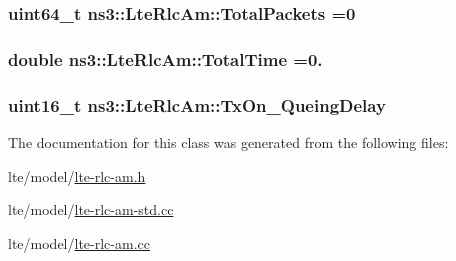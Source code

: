 \subsubsection[{\texorpdfstring{Total\+Packets}{TotalPackets}}]{\setlength{\rightskip}{0pt plus 5cm}uint64\+\_\+t ns3\+::\+Lte\+Rlc\+Am\+::\+Total\+Packets =0\hspace{0.3cm}{\ttfamily [private]}}\hypertarget{classns3_1_1LteRlcAm_a1b03629adba01263bcdb8a64606eddea}{}\label{classns3_1_1LteRlcAm_a1b03629adba01263bcdb8a64606eddea}
\subsubsection[{\texorpdfstring{Total\+Time}{TotalTime}}]{\setlength{\rightskip}{0pt plus 5cm}double ns3\+::\+Lte\+Rlc\+Am\+::\+Total\+Time =0.\hspace{0.3cm}{\ttfamily [private]}}\hypertarget{classns3_1_1LteRlcAm_a7ea7ad8fc456ed782e8d18b33ece017b}{}\label{classns3_1_1LteRlcAm_a7ea7ad8fc456ed782e8d18b33ece017b}
\subsubsection[{\texorpdfstring{Tx\+On\+\_\+\+Queing\+Delay}{TxOn_QueingDelay}}]{\setlength{\rightskip}{0pt plus 5cm}uint16\+\_\+t ns3\+::\+Lte\+Rlc\+Am\+::\+Tx\+On\+\_\+\+Queing\+Delay\hspace{0.3cm}{\ttfamily [private]}}\hypertarget{classns3_1_1LteRlcAm_a3f8140197bec7546c991d67f4416c768}{}\label{classns3_1_1LteRlcAm_a3f8140197bec7546c991d67f4416c768}


The documentation for this class was generated from the following files\+:\begin{DoxyCompactItemize}
\item 
lte/model/\hyperlink{lte-rlc-am_8h}{lte-\/rlc-\/am.\+h}\item 
lte/model/\hyperlink{lte-rlc-am-std_8cc}{lte-\/rlc-\/am-\/std.\+cc}\item 
lte/model/\hyperlink{lte-rlc-am_8cc}{lte-\/rlc-\/am.\+cc}\end{DoxyCompactItemize}
